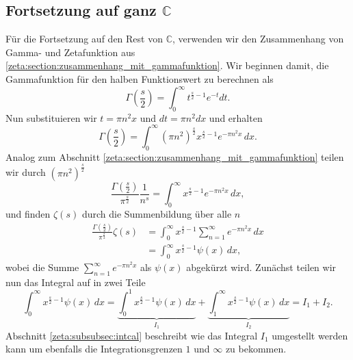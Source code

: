 \subsection{Fortsetzung auf ganz $\mathbb{C}$} \label{zeta:subsection:auf_ganz}
Für die Fortsetzung auf den Rest von $\mathbb{C}$, verwenden wir den Zusammenhang von Gamma- und Zetafunktion aus \ref{zeta:section:zusammenhang_mit_gammafunktion}.
Wir beginnen damit, die Gammafunktion für den halben Funktionswert zu berechnen als
\begin{equation}
    \Gamma \left( \frac{s}{2} \right)
    =
    \int_0^{\infty} t^{\frac{s}{2}-1} e^{-t} dt.
\end{equation}
Nun substituieren wir $t = \pi n^2 x$ und $dt=\pi n^2 dx$ und erhalten
\begin{equation}
    \Gamma \left( \frac{s}{2} \right)
    =
    \int_0^{\infty}
    (\pi n^2)^{\frac{s}{2}}
    x^{\frac{s}{2}-1}
    e^{-\pi n^2 x}
    \,dx.
\end{equation}
Analog zum Abschnitt \ref{zeta:section:zusammenhang_mit_gammafunktion} teilen wir durch $(\pi n^2)^{\frac{s}{2}}$
\begin{equation}
    \frac{\Gamma \left( \frac{s}{2} \right)}{\pi^{\frac{s}{2}}}
    \frac{1}{n^s}
     =
    \int_0^{\infty}
    x^{\frac{s}{2}-1}
    e^{-\pi n^2 x}
    \,dx,
\end{equation}
und finden $\zeta(s)$ durch die Summenbildung über alle $n$
\begin{align}
    \frac{\Gamma \left( \frac{s}{2} \right)}{\pi^{\frac{s}{2}}}
    \zeta(s)
    &=
    \int_0^{\infty}
    x^{\frac{s}{2}-1}
    \sum_{n=1}^{\infty}
    e^{-\pi n^2 x}
    \,dx\label{zeta:equation:integral1}
    \\
    &=
    \int_0^{\infty}
    x^{\frac{s}{2}-1}
    \psi(x)
    \,dx,
\end{align}
wobei die Summe $\sum_{n=1}^{\infty} e^{-\pi n^2 x}$ als $\psi(x)$ abgekürzt wird.
Zunächst teilen wir nun das Integral auf in zwei Teile
\begin{equation}\label{zeta:equation:integral2}
    \int_0^{\infty}
    x^{\frac{s}{2}-1}
    \psi(x)
    \,dx
    =
    \underbrace{
    \int_0^{1}
    x^{\frac{s}{2}-1}
    \psi(x)
    \,dx
    }_{\displaystyle{I_1}}
    +
    \underbrace{
    \int_1^{\infty}
    x^{\frac{s}{2}-1}
    \psi(x)
    \,dx
    }_{\displaystyle{I_2}}
    =
    I_1 + I_2.
\end{equation}
Abschnitt \ref{zeta:subsubsec:intcal} beschreibt wie das Integral $I_1$ umgestellt werden kann um ebenfalls die Integrationsgrenzen $1$ und $\infty$ zu bekommen.
